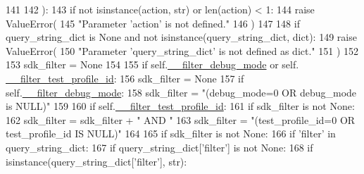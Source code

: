 \begin{DoxyCode}
141 
142     ):
143         \textcolor{keywordflow}{if} \textcolor{keywordflow}{not} isinstance(action, str) \textcolor{keywordflow}{or} len(action) < 1:
144             \textcolor{keywordflow}{raise} ValueError(
145                 \textcolor{stringliteral}{"Parameter 'action' is not defined."}
146                 )
147 
148         \textcolor{keywordflow}{if} query\_string\_dict \textcolor{keywordflow}{is} \textcolor{keywordtype}{None} \textcolor{keywordflow}{and} \textcolor{keywordflow}{not} isinstance(query\_string\_dict, dict):
149             \textcolor{keywordflow}{raise} ValueError(
150                 \textcolor{stringliteral}{"Parameter 'query\_string\_dict' is not defined as dict."}
151                 )
152 
153         sdk\_filter = \textcolor{keywordtype}{None}
154 
155         \textcolor{keywordflow}{if} self.\hyperlink{classtune_1_1management_1_1reports_1_1reports__base_1_1ReportsBase_a90eca5e0c1887df285f34643969652a1}{\_\_filter\_debug\_mode} \textcolor{keywordflow}{or} self.
      \hyperlink{classtune_1_1management_1_1reports_1_1reports__base_1_1ReportsBase_a00dede100fc4e3a6468f15a057bfc1c1}{\_\_filter\_test\_profile\_id}:
156             sdk\_filter = \textcolor{keywordtype}{None}
157             \textcolor{keywordflow}{if} self.\hyperlink{classtune_1_1management_1_1reports_1_1reports__base_1_1ReportsBase_a90eca5e0c1887df285f34643969652a1}{\_\_filter\_debug\_mode}:
158                 sdk\_filter = \textcolor{stringliteral}{"(debug\_mode=0 OR debug\_mode is NULL)"}
159 
160             \textcolor{keywordflow}{if} self.\hyperlink{classtune_1_1management_1_1reports_1_1reports__base_1_1ReportsBase_a00dede100fc4e3a6468f15a057bfc1c1}{\_\_filter\_test\_profile\_id}:
161                 \textcolor{keywordflow}{if} sdk\_filter \textcolor{keywordflow}{is} \textcolor{keywordflow}{not} \textcolor{keywordtype}{None}:
162                     sdk\_filter = sdk\_filter + \textcolor{stringliteral}{" AND "}
163                 sdk\_filter = \textcolor{stringliteral}{"(test\_profile\_id=0 OR test\_profile\_id IS NULL)"}
164 
165         \textcolor{keywordflow}{if} sdk\_filter \textcolor{keywordflow}{is} \textcolor{keywordflow}{not} \textcolor{keywordtype}{None}:
166             \textcolor{keywordflow}{if} \textcolor{stringliteral}{'filter'} \textcolor{keywordflow}{in} query\_string\_dict:
167                 \textcolor{keywordflow}{if} query\_string\_dict[\textcolor{stringliteral}{'filter'}] \textcolor{keywordflow}{is} \textcolor{keywordflow}{not} \textcolor{keywordtype}{None}:
168                     \textcolor{keywordflow}{if} isinstance(query\_string\_dict[\textcolor{stringliteral}{'filter'}], str):

\end{DoxyCode}

